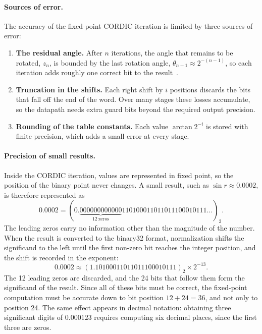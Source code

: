 \paragraph{Sources of error.}
The accuracy of the fixed-point CORDIC iteration is limited by three sources
of error:
\begin{enumerate}
  \item \textbf{The residual angle.} After $n$ iterations, the angle that
    remains to be rotated, $z_{n}$, is bounded by the last rotation angle,
    $\theta_{n-1} \approx 2^{-(n-1)}$, so each iteration adds roughly one
    correct bit to the result~\cite{muller2020}.
  \item \textbf{Truncation in the shifts.} Each right shift by $i$ positions
    discards the bits that fall off the end of the word. Over many stages
    these losses accumulate, so the datapath needs extra guard bits beyond
    the required output precision.
  \item \textbf{Rounding of the table constants.} Each value
    $\arctan 2^{-i}$ is stored with finite precision, which adds a small
    error at every stage.
\end{enumerate}

\paragraph{Precision of small results.}
\label{pa:precision}
Inside the CORDIC iteration, values are represented in fixed point, so the
position of the binary point never changes. A small result, such as
$\sin r \approx 0.0002$, is therefore represented as
\begin{equation*}
  0.0002 = (0.\underbrace{000000000000}_{12\ \text{zeros}}
  110100011011011100010111\ldots)_{2}.
\end{equation*}
The leading zeros carry no information other than the magnitude of the
number. When the result is converted to the binary32 format, normalization
shifts the significand to the left until the first non-zero bit reaches the
integer position, and the shift is recorded in the exponent:
\begin{equation*}
  0.0002 \approx (1.10100011011011100010111)_{2} \times 2^{-13}.
\end{equation*}
The 12 leading zeros are discarded, and the 24 bits that follow them form the
significand of the result. Since all of these bits must be correct, the
fixed-point computation must be accurate down to bit position
$12 + 24 = 36$, and not only to position 24. The same effect appears in
decimal notation: obtaining three significant digits of $0.000123$ requires
computing six decimal places, since the first three are zeros.

